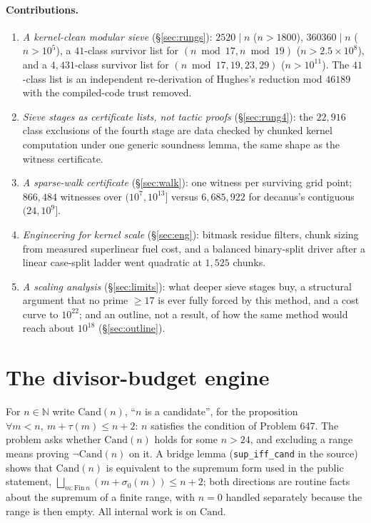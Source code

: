 \documentclass[11pt]{article}
\newcommand{\Cand}{\mathrm{Cand}}
\begin{document}
\paragraph{Contributions.}
\begin{enumerate}
\item \emph{A kernel-clean modular sieve} (\S\ref{sec:rungs}): $2520\mid n$ ($n>1800$), $360360\mid n$ ($n>10^{5}$), a $41$-class survivor list for $(n\bmod 17,n\bmod 19)$ ($n>2.5\times10^{8}$), and a $4{,}431$-class survivor list for $(n\bmod 17,19,23,29)$ ($n>10^{11}$). The $41$-class list is an independent re-derivation of Hughes's reduction mod $46189$ with the compiled-code trust removed.
\item \emph{Sieve stages as certificate lists, not tactic proofs} (\S\ref{sec:rung4}): the $22{,}916$ class exclusions of the fourth stage are data checked by chunked kernel computation under one generic soundness lemma, the same shape as the witness certificate.
\item \emph{A sparse-walk certificate} (\S\ref{sec:walk}): one witness per surviving grid point; $866{,}484$ witnesses over $(10^{7},10^{13}]$ versus $6{,}685{,}922$ for decanus's contiguous $(24,10^{9}]$.
\item \emph{Engineering for kernel scale} (\S\ref{sec:eng}): bitmask residue filters, chunk sizing from measured superlinear fuel cost, and a balanced binary-split driver after a linear case-split ladder went quadratic at $1{,}525$ chunks.
\item \emph{A scaling analysis} (\S\ref{sec:limits}): what deeper sieve stages buy, a structural argument that no prime $\ge17$ is ever fully forced by this method, and a cost curve to $10^{22}$; and an outline, not a result, of how the same method would reach about $10^{18}$ (\S\ref{sec:outline}).
\end{enumerate}

\section{The divisor-budget engine}

For $n\in\mathbb{N}$ write $\Cand(n)$, ``$n$ is a candidate'', for the proposition $\forall m<n,\ m+\tau(m)\le n+2$: $n$ satisfies the condition of Problem 647. The problem asks whether $\Cand(n)$ holds for some $n>24$, and excluding a range means proving $\neg\Cand(n)$ on it. A bridge lemma (\texttt{sup\_iff\_cand} in the source) shows that $\Cand(n)$ is equivalent to the supremum form used in the public statement, $\bigsqcup_{m:\mathrm{Fin}\,n} (m+\sigma_0(m))\le n+2$; both directions are routine facts about the supremum of a finite range, with $n=0$ handled separately because the range is then empty. All internal work is on $\Cand$.
\end{document}
